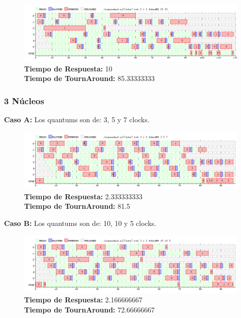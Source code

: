 \documentclass[a4paper]{article}
\begin{document}
		 \begin{figure}[h!]
   \begin{center}
 	\includegraphics[scale=0.5]{imagenes/ej7/2nucleoC.png}
 	\textbf{Tiempo de Respuesta:} 10 \\
 	\textbf{Tiempo de TournAround:} 85.33333333 \\
   \end{center}
 \end{figure} 
 
 \newpage
	\subsubsection*{3 N\'ucleos}
	
	\textbf{Caso A:} Los quantums son de: 3, 5 y 7 clocks.

		 \begin{figure}[h!]
   \begin{center}
 	\includegraphics[scale=0.5]{imagenes/ej7/3nucleoA.png}
 	\textbf{Tiempo de Respuesta:} 2.333333333 \\
 	\textbf{Tiempo de TournAround:} 81.5 \\
   \end{center}
 \end{figure} 
 	
	\textbf{Caso B:}  Los quantums son de: 10, 10 y 5 clocks.

		 \begin{figure}[h!]
   \begin{center}
 	\includegraphics[scale=0.5]{imagenes/ej7/3nucleoB.png}
 	\textbf{Tiempo de Respuesta:} 2.166666667 \\
 	\textbf{Tiempo de TournAround:} 72.66666667 \\
   \end{center}
 \end{figure} 
 	
\end{document}
